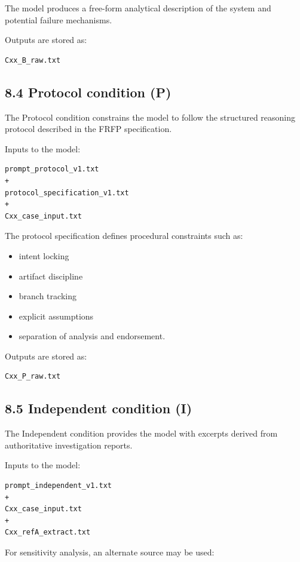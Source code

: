 {The model produces a free-form analytical description of the system and potential failure mechanisms.

Outputs are stored as:

\begin{verbatim}
Cxx_B_raw.txt
\end{verbatim}

\subsection*{8.4 Protocol condition (P)}

The Protocol condition constrains the model to follow the structured reasoning protocol described in the FRFP specification.

Inputs to the model:

\begin{verbatim}
prompt_protocol_v1.txt
+
protocol_specification_v1.txt
+
Cxx_case_input.txt
\end{verbatim}

The protocol specification defines procedural constraints such as:

\begin{itemize}
\item intent locking
\item artifact discipline
\item branch tracking
\item explicit assumptions
\item separation of analysis and endorsement.
\end{itemize}

Outputs are stored as:

\begin{verbatim}
Cxx_P_raw.txt
\end{verbatim}

\subsection*{8.5 Independent condition (I)}

The Independent condition provides the model with excerpts derived from authoritative investigation reports.

Inputs to the model:

\begin{verbatim}
prompt_independent_v1.txt
+
Cxx_case_input.txt
+
Cxx_refA_extract.txt
\end{verbatim}

For sensitivity analysis, an alternate source may be used:

}
